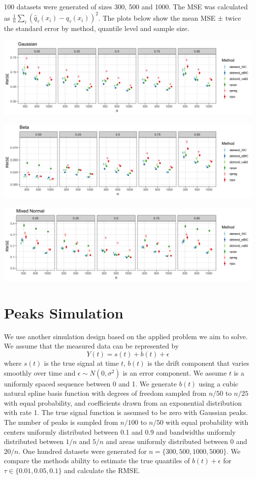 \documentclass[12pt]{article}
\numberwithin{equation}{section}
\theoremstyle{plain}
\begin{document}
100 datasets were generated of sizes 300, 500 and 1000. The MSE was calculated as $\frac{1}{n}\sum_i (\hat{q}_{\tau}(x_i) - q_\tau(x_i))^2$. The plots below show the mean MSE $\pm$ twice the standard error by method, quantile level and sample size. 
	 
\includegraphics[width=\linewidth]{Figures/gaus_mse.png}	

\includegraphics[width=\linewidth]{Figures/shapebeta_mse.png}

\includegraphics[width=\linewidth]{Figures/mixednorm_mse.png}


\section{Peaks Simulation}
We use another simulation design based on the applied problem we aim to solve. We assume that the measured data can be represented by 
\begin{equation}
Y(t) = s(t) + b(t) + \epsilon
\end{equation} 
where $s(t)$ is the true signal at time $t$, $b(t)$ is the drift component that varies smoothly over time and $\epsilon \sim N(0, \sigma^2)$ is an error component. We assume $t$ is a uniformly spaced sequence between 0 and 1. We generate $b(t)$ using a cubic natural spline basis function with degrees of freedom sampled from $n/50$ to $n/25$ with equal probability, and coefficients drawn from an exponential distribution with rate 1. The true signal function is assumed to be zero with Gaussian peaks. The number of peaks is sampled from $n/100$ to $n/50$ with equal probability with centers uniformly distributed between 0.1 and 0.9 and bandwidths uniformly distributed between $1/n$ and $5/n$ and areas uniformly distributed between 0 and $20/n$. One hundred datasets were generated for $n=\{300,500,1000, 5000\}$. We compare the methods ability to estimate the true quantiles of $b(t) + \epsilon$  for $\tau \in \{0.01, 0.05, 0.1\}$ and calculate the RMSE. 
\end{document}
